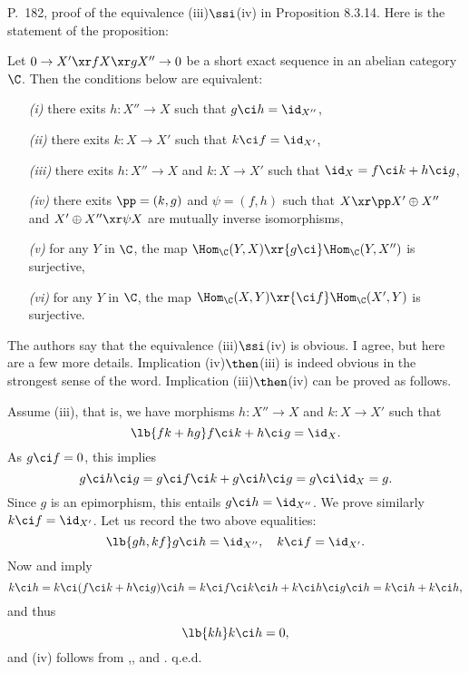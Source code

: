 \documentclass[12pt]{article}
\theoremstyle{remark}
\theoremstyle{definition}
\begin{document}
%

\begin{s} 
P.~182, proof of the equivalence (iii)$\ssi$(iv) in Proposition 8.3.14. Here is the statement of the proposition:

\begin{prop}[Proposition 8.3.14 p. 182] 
Let $0\to X'\xr fX\xr gX''\to0$ be a short exact sequence in an abelian category $\C$. Then the conditions below are equivalent:
\begin{itemize}
\item[\em(i)] there exits $h:X''\to X$ such that $g\ci h=\id_{X''}$,
\item[\em(ii)] there exits $k:X\to X'$ such that $k\ci f=\id_{X'}$,
\item[\em(iii)] there exits $h:X''\to X$ and $k:X\to X'$ such that $\id_X=f\ci k+h\ci g$,
\item[\em(iv)] there exits $\pp=(k,g)$ and $\psi=(f,h)$ such that $X\xr\pp X'\oplus X''$ and $X'\oplus X''\xr\psi X$ are mutually inverse isomorphisms,
\item[\em(v)] for any $Y$ in $\C$, the map $\Hom_\C(Y,X)\xr{g\ci}\Hom_\C(Y,X'')$ is surjective,
\item[\em(vi)] for any $Y$ in $\C$, the map $\Hom_\C(X,Y)\xr{\ci f}\Hom_\C(X',Y)$ is surjective.
\end{itemize}
\end{prop}

The authors say that the equivalence (iii)$\ssi$(iv) is obvious. I agree, but here are a few more details. Implication (iv)$\then$(iii) is indeed obvious in the strongest sense of the word. Implication (iii)$\then$(iv) can be proved as follows. 

Assume (iii), that is, we have morphisms $h:X''\to X$ and $k:X\to X'$ such that 
\begin{equation}\lb{fk+hg} 
f\ci k+h\ci g=\id_X.
\end{equation} 
As $g\ci f=0$, this implies 
$$
g\ci h\ci g=g\ci f\ci k+g\ci h\ci g=g\ci\id_X=g. 
$$ 
Since $g$ is an epimorphism, this entails $g\ci h=\id_{X''}$. We prove similarly $k\ci f=\id_{X'}$. Let us record the two above equalities: 
\begin{equation}\lb{gh,kf} 
g\ci h=\id_{X''},\quad k\ci f=\id_{X'}.
\end{equation} 
Now  and  imply 
$$
k\ci h=k\ci(f\ci k+h\ci g)\ci h=k\ci f\ci k\ci h+k\ci h\ci g\ci h=k\ci h+k\ci h,
$$ 
and thus 
\begin{equation}\lb{kh} 
k\ci h=0, 
\end{equation} 
and (iv) follows from ,, and . q.e.d.
\end{s}
\end{document}
